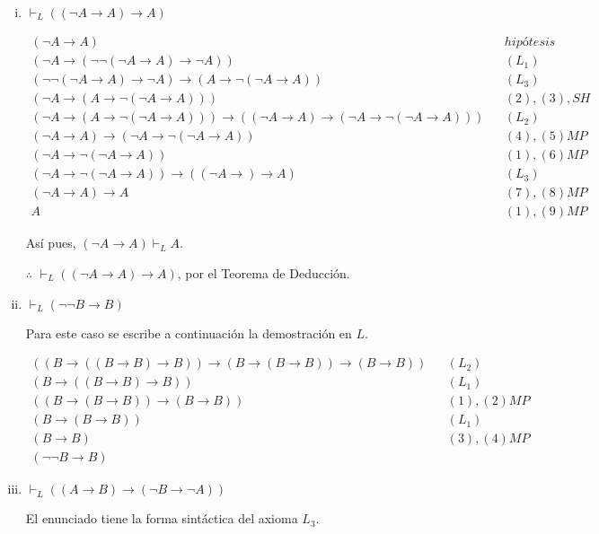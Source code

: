 \documentclass[osajnl,twocolumn,showpacs,superscriptaddress,10pt,leqno]{revtex4-1} %
\begin{document}
\begin{enumerate}[i.]
    \item $\vdash_L ((\neg A \rightarrow A) \rightarrow A)$

    \begin{align}
        (\neg A \rightarrow A) && hipótesis \\
        (\neg A \rightarrow (\neg \neg (\neg A \rightarrow A) \rightarrow \neg A)) && (L_{1}) \\
        (\neg \neg (\neg A \rightarrow A) \rightarrow \neg A) \rightarrow (A \rightarrow \neg (\neg A \rightarrow A)) && (L_{3}) \\
        (\neg A \rightarrow (A \rightarrow \neg (\neg A \rightarrow A))) && (2), (3), SH \\
        (\neg A \rightarrow (A \rightarrow \neg (\neg A \rightarrow A))) \rightarrow ((\neg A \rightarrow A) \rightarrow (\neg A \rightarrow \neg (\neg A \rightarrow A))) && (L_{2}) \\
        (\neg A \rightarrow A) \rightarrow (\neg A \rightarrow \neg (\neg A \rightarrow A)) && (4), (5) MP \\
        (\neg A \rightarrow \neg (\neg A \rightarrow A)) && (1), (6) MP \\
        (\neg A \rightarrow \neg (\neg A \rightarrow A)) \rightarrow ((\neg A \rightarrow) \rightarrow A) && (L_{3}) \\
        (\neg A \rightarrow A) \rightarrow A && (7), (8) MP \\
        A && (1), (9) MP
    \end{align}

    Así pues, $(\neg A \rightarrow A) \vdash_L A$.
    
    $\therefore$ $\vdash_L ((\neg A \rightarrow A) \rightarrow A)$, por el Teorema de Deducción.

    \item $\vdash_L (\neg \neg B \rightarrow B)$

    Para este caso se escribe a continuación la demostración en $L$.

    \begin{align}
        ((B \rightarrow ((B \rightarrow B) \rightarrow B)) \rightarrow (B \rightarrow (B \rightarrow B)) \rightarrow (B \rightarrow B)) && (L_{2}) \\
        (B \rightarrow ((B \rightarrow B) \rightarrow B)) && (L_{1}) \\
        ((B \rightarrow (B \rightarrow B)) \rightarrow (B \rightarrow B)) && (1), (2) MP \\
        (B \rightarrow (B \rightarrow B)) && (L_{1}) \\
        (B \rightarrow B) && (3), (4) MP \\
        (\neg \neg B \rightarrow B)
    \end{align}

    \item $\vdash_L ((A \rightarrow B) \rightarrow (\neg B \rightarrow \neg A))$

    El enunciado tiene la forma sintáctica del axioma $L_{3}$.
\end{enumerate}
\end{document}

